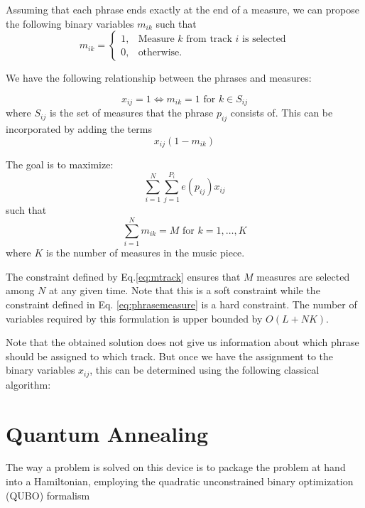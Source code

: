 \documentclass[11pt,a4paper]{article}
\begin{document}
Assuming that each phrase ends exactly at the end of a measure, we can propose the following binary variables $m_{ik}$ such that
\begin{equation}
m_{ik} =   \begin{cases}%
1,      & \text{Measure $k$ from track $i$ is selected}\\
0, & \text{otherwise.}
\end{cases}
\end{equation}

We have the following relationship between the phrases and measures:

\begin{equation}\label{eq:phrasemeasure}
x_{ij} = 1 \iff m_{ik}=1 \mbox{ for } k \in S_{ij}
\end{equation}
where $S_{ij}$ is the set of measures that the phrase $p_{ij}$ consists of. This can be incorporated by adding the terms 
\begin{equation}
x_{ij}(1-m_{ik})
\end{equation}

The goal is to maximize:
\begin{equation}
\sum_{i=1}^N\sum_{j=1}^{P_i} e(p_{ij})x_{ij}
\end{equation}
such that
\begin{equation}\label{eq:mtrack}
\sum_{i=1}^N m_{ik} = M \mbox{ for }k=1,\dots, K 
\end{equation}
where $K$ is the number of measures in the music piece. 

The constraint defined by Eq.\eqref{eq:mtrack} ensures that $M$ measures are selected among $ N $ at any given time. Note that this is a soft constraint while the constraint defined in Eq. \ref{eq:phrasemeasure} is a hard constraint. The number of variables required by this formulation is upper bounded by $ O(L+NK) $.

Note that the obtained solution does not give us information about which phrase should be assigned to which track. But once we have the assignment to the binary variables $ x_{ij} $, this can be determined using the following classical algorithm:

\section{Quantum Annealing}
The way a problem is solved on this device is to package the problem at hand into a Hamiltonian, employing the quadratic unconstrained binary optimization (QUBO) formalism
\end{document}
